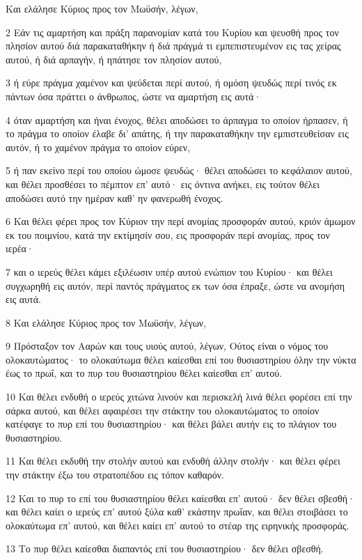 \par Και ελάλησε Κύριος προς τον Μωϋσήν, λέγων,
\par 2 Εάν τις αμαρτήση και πράξη παρανομίαν κατά του Κυρίου και ψευσθή προς τον πλησίον αυτού διά παρακαταθήκην ή διά πράγμά τι εμπεπιστευμένον εις τας χείρας αυτού, ή διά αρπαγήν, ή ηπάτησε τον πλησίον αυτού,
\par 3 ή εύρε πράγμα χαμένον και ψεύδεται περί αυτού, ή ομόση ψευδώς περί τινός εκ πάντων όσα πράττει ο άνθρωπος, ώστε να αμαρτήση εις αυτά·
\par 4 όταν αμαρτήση και ήναι ένοχος, θέλει αποδώσει το άρπαγμα το οποίον ήρπασεν, ή το πράγμα το οποίον έλαβε δι' απάτης, ή την παρακαταθήκην την εμπιστευθείσαν εις αυτόν, ή το χαμένον πράγμα το οποίον εύρεν,
\par 5 ή παν εκείνο περί του οποίου ώμοσε ψευδώς· θέλει αποδώσει το κεφάλαιον αυτού, και θέλει προσθέσει το πέμπτον επ' αυτό· εις όντινα ανήκει, εις τούτον θέλει αποδώσει αυτό την ημέραν καθ' ην φανερωθή ένοχος.
\par 6 Και θέλει φέρει προς τον Κύριον την περί ανομίας προσφοράν αυτού, κριόν άμωμον εκ του ποιμνίου, κατά την εκτίμησίν σου, εις προσφοράν περί ανομίας, προς τον ιερέα·
\par 7 και ο ιερεύς θέλει κάμει εξιλέωσιν υπέρ αυτού ενώπιον του Κυρίου· και θέλει συγχωρηθή εις αυτόν, περί παντός πράγματος εκ των όσα έπραξε, ώστε να ανομήση εις αυτά.
\par 8 Και ελάλησε Κύριος προς τον Μωϋσήν, λέγων,
\par 9 Πρόσταξον τον Ααρών και τους υιούς αυτού, λέγων, Ούτος είναι ο νόμος του ολοκαυτώματος· το ολοκαύτωμα θέλει καίεσθαι επί του θυσιαστηρίου όλην την νύκτα έως το πρωΐ, και το πυρ του θυσιαστηρίου θέλει καίεσθαι επ' αυτού.
\par 10 Και θέλει ενδυθή ο ιερεύς χιτώνα λινούν και περισκελή λινά θέλει φορέσει επί την σάρκα αυτού, και θέλει αφαιρέσει την στάκτην του ολοκαυτώματος το οποίον κατέφαγε το πυρ επί του θυσιαστηρίου· και θέλει βάλει αυτήν εις το πλάγιον του θυσιαστηρίου.
\par 11 Και θέλει εκδυθή την στολήν αυτού και ενδυθή άλλην στολήν· και θέλει φέρει την στάκτην έξω του στρατοπέδου εις τόπον καθαρόν.
\par 12 Και το πυρ το επί του θυσιαστηρίου θέλει καίεσθαι επ' αυτού· δεν θέλει σβεσθή· και θέλει καίει ο ιερεύς επ' αυτού ξύλα καθ' εκάστην πρωΐαν, και θέλει στοιβάσει το ολοκαύτωμα επ' αυτού, και θέλει καίει επ' αυτού το στέαρ της ειρηνικής προσφοράς.
\par 13 Το πυρ θέλει καίεσθαι διαπαντός επί του θυσιαστηρίου· δεν θέλει σβεσθή.
